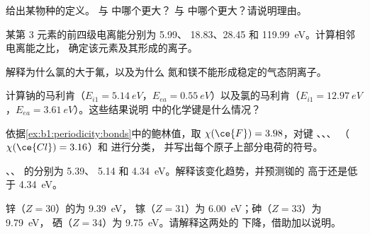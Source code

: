 \begin{exercise}[$\star$]\label{exo:b1:periodicity:4}
给出某物种的定义。 与
 中哪个更大？ 与  中哪个更大？请说明理由。
\end{exercise}

\begin{exercise}[$\star\star$]\label{exo:b1:periodicity:5}
某第 3 元素的前四级电离能分别为 5.99、
18.83、28.45 和 \qty{119.99}{eV}。计算相邻电离能之比，
确定该元素及其形成的离子。
\end{exercise}

\begin{exercise}[$\star\star$]\label{exo:b1:periodicity:6}
解释为什么氯的大于氟，以及为什么
氮和镁不能形成稳定的气态阴离子。
\end{exercise}

\begin{exercise}[$\star\star$]\label{exo:b1:periodicity:7}
计算钠的马利肯（$E_{i1} =
\qty{5.14}{eV}$，$E_{ea} = \qty{0.55}{eV}$）以及氯的马利肯（$E_{i1} =
\qty{12.97}{eV}$，$E_{ea} = \qty{3.61}{eV}$）。这些结果说明
 中的化学键是什么情况？
\end{exercise}

\begin{exercise}[$\star\star$]\label{exo:b1:periodicity:8}
依据\cref{ex:b1:periodicity:bonds}中的鲍林值，取 $\chi(\ce{F})
= 3.98$，对键 、、、
（$\chi(\ce{Cl}) = 3.16$）和  进行分类，
并写出每个原子上部分电荷的符号。
\end{exercise}

\begin{exercise}[$\star\star$]\label{exo:b1:periodicity:9}
、、 的分别为 5.39、
5.14 和 \qty{4.34}{eV}。解释该变化趋势，并预测铷的
高于还是低于 \qty{4.34}{eV}。
\end{exercise}

\begin{exercise}[$\star\star\star$]\label{exo:b1:periodicity:10}
锌（$Z = 30$）的为 \qty{9.39}{eV}，
镓（$Z = 31$）为 \qty{6.00}{eV}；砷（$Z = 33$）为 \qty{9.79}{eV}，
硒（$Z = 34$）为 \qty{9.75}{eV}。请解释这两处的
下降，借助加以说明。
\end{exercise}


